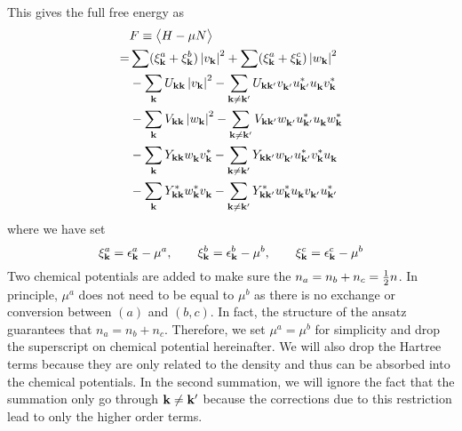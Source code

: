 This gives the full free energy as 
\begin{equation}\label{eq:uvw:F}
 \begin{split}
  &F\equiv\bigl<{H-\mu{}N}\bigr>\\
    =&\sum(\xi^a_{\mathbf{k}}+\xi^b_{\mathbf{k}})\left\lvert{v_{\ensuremath{\mathbf{k}}}}\right\rvert^2+\sum(\xi^a_{\mathbf{k}}+\xi^c_{\mathbf{k}})\left\lvert{w_{\ensuremath{\mathbf{k}}}}\right\rvert^2\\
    &-\sum_{\mathbf{k}}U_{\mathbf{k}\mathbf{k}}\left\lvert{v_{\ensuremath{\mathbf{k}}}}\right\rvert^2-\sum_{\mathbf{k}\neq\mathbf{k}'}U_{\mathbf{k}\mathbf{k}'}v^{}_{\mathbf{k}'}u^*_{\mathbf{k}'}u^{}_{\mathbf{k}}{}v^*_{\mathbf{k}}\\
    &-\sum_{\mathbf{k}}V_{\mathbf{k}\mathbf{k}}\left\lvert{w_{\ensuremath{\mathbf{k}}}}\right\rvert^2
      -\sum_{\mathbf{k}\neq\mathbf{k}'}V_{\mathbf{k}\mathbf{k}'}w^{}_{\mathbf{k}'}u^*_{\mathbf{k}'}u^{}_{\mathbf{k}}{}w^*_{\mathbf{k}}\\
    &-\sum_{\mathbf{k}}Y_{\mathbf{k}\mathbf{k}}w^{}_{\mathbf{k}}v^*_{\mathbf{k}}{}
      -\sum_{\mathbf{k}\neq\mathbf{k}'}Y_{\mathbf{k}\mathbf{k}'}w^{}_{\mathbf{k}'}{u^{*}_{\mathbf{k}'}}v^*_{\mathbf{k}}{}u^{}_{\mathbf{k}}\\
    &-\sum_{\mathbf{k}}Y^*_{\mathbf{k}\mathbf{k}}w^*_{\mathbf{k}}v^{}_{\mathbf{k}}{}
      -\sum_{\mathbf{k}\neq\mathbf{k}'}Y^*_{\mathbf{k}\mathbf{k}'}w^*_{\mathbf{k}}{u^{}_{\mathbf{k}}}v^{}_{\mathbf{k}'}{}u^{*}_{\mathbf{k}'}
 \end{split}
\end{equation}
where we have set
\begin{equation*}
 \xi^a_{\mathbf{k}}=\epsilon^a_{\mathbf{k}}-\mu^a,\qquad\xi^b_{\mathbf{k}}=\epsilon^b_{\mathbf{k}}-\mu^b,\qquad\xi^c_{\mathbf{k}}=\epsilon^c_{\mathbf{k}}-\mu^b
\end{equation*}
 Two chemical potentials are added to make sure the $n_a=n_b+n_c=\frac{1}{2}n$.  In principle, $\mu^{a}$ does not need to be equal to $\mu^{b}$  as there is no exchange or conversion between $(a)$ and $(b,c)$.  In fact, the structure of the ansatz guarantees that $n_a=n_b+n_c$. Therefore, we set $\mu^{a}=\mu^{b}$ for simplicity and drop the superscript on chemical potential hereinafter. 
We will also drop the Hartree terms because they are  only related to the density and thus can be absorbed into the chemical potentials.   In the second summation, we will ignore the fact that the summation only go through $\mathbf{k}\neq\mathbf{k}'$ because the corrections due to this restriction lead to only the higher order terms. 
 
